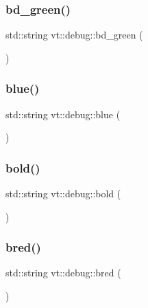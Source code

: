 \subsubsection{\texorpdfstring{bd\+\_\+green()}{bd\_green()}}
{\footnotesize\ttfamily std\+::string vt\+::debug\+::bd\+\_\+green (\begin{DoxyParamCaption}{ }\end{DoxyParamCaption})\hspace{0.3cm}{\ttfamily [inline]}}

\mbox{\label{namespacevt_1_1debug_a26b73aa7586b78f4c148b26e5414ebe1}} 
\subsubsection{\texorpdfstring{blue()}{blue()}}
{\footnotesize\ttfamily std\+::string vt\+::debug\+::blue (\begin{DoxyParamCaption}{ }\end{DoxyParamCaption})\hspace{0.3cm}{\ttfamily [inline]}}

\mbox{\label{namespacevt_1_1debug_a7a1e7bc4a250917d20840a4d48e27388}} 
\subsubsection{\texorpdfstring{bold()}{bold()}}
{\footnotesize\ttfamily std\+::string vt\+::debug\+::bold (\begin{DoxyParamCaption}{ }\end{DoxyParamCaption})\hspace{0.3cm}{\ttfamily [inline]}}

\mbox{\label{namespacevt_1_1debug_ae03a761958b929eaa82f356059f71a46}} 
\subsubsection{\texorpdfstring{bred()}{bred()}}
{\footnotesize\ttfamily std\+::string vt\+::debug\+::bred (\begin{DoxyParamCaption}{ }\end{DoxyParamCaption})\hspace{0.3cm}{\ttfamily [inline]}}

